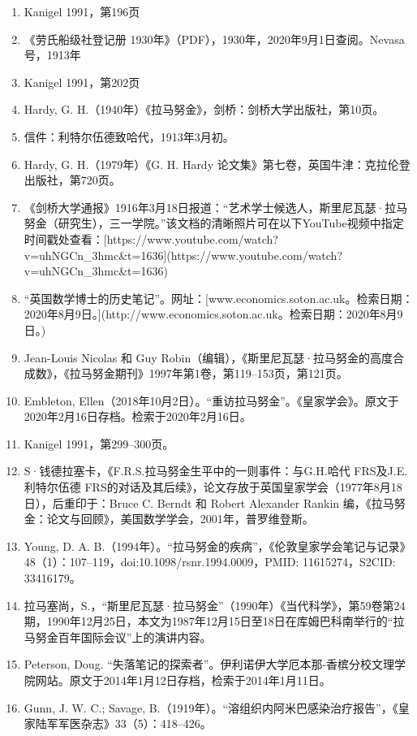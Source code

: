 \begin{enumerate}
\item Kanigel 1991，第196页
\item 《劳氏船级社登记册 1930年》（PDF），1930年，2020年9月1日查阅。Nevasa号，1913年
\item Kanigel 1991，第202页
\item Hardy, G. H.（1940年）《拉马努金》，剑桥：剑桥大学出版社，第10页。
\item 信件：利特尔伍德致哈代，1913年3月初。
\item Hardy, G. H.（1979年）《G. H. Hardy 论文集》第七卷，英国牛津：克拉伦登出版社，第720页。
\item 《剑桥大学通报》1916年3月18日报道：“艺术学士候选人，斯里尼瓦瑟·拉马努金（研究生），三一学院。”该文档的清晰照片可在以下YouTube视频中指定时间戳处查看：[https://www.youtube.com/watch?v=uhNGCn\_3hmc\&t=1636](https://www.youtube.com/watch?v=uhNGCn_3hmc&t=1636)
\item “英国数学博士的历史笔记”。网址：[www.economics.soton.ac.uk。检索日期：2020年8月9日。](http://www.economics.soton.ac.uk。检索日期：2020年8月9日。)
\item Jean-Louis Nicolas 和 Guy Robin（编辑），《斯里尼瓦瑟·拉马努金的高度合成数》，《拉马努金期刊》1997年第1卷，第119–153页，第121页。
\item Embleton, Ellen（2018年10月2日）。“重访拉马努金”。《皇家学会》。原文于2020年2月16日存档。检索于2020年2月16日。
\item Kanigel 1991，第299–300页。
\item S·钱德拉塞卡，《F.R.S.拉马努金生平中的一则事件：与G.H.哈代 FRS及J.E.利特尔伍德 FRS的对话及其后续》，论文存放于英国皇家学会（1977年8月18日），后重印于：Bruce C. Berndt 和 Robert Alexander Rankin 编，《拉马努金：论文与回顾》，美国数学学会，2001年，普罗维登斯。
\item Young, D. A. B.（1994年）。“拉马努金的疾病”，《伦敦皇家学会笔记与记录》48（1）：107–119，doi:10.1098/rsnr.1994.0009，PMID: 11615274，S2CID: 33416179。
\item 拉马塞尚，S.，“斯里尼瓦瑟·拉马努金”（1990年）《当代科学》，第59卷第24期，1990年12月25日，本文为1987年12月15日至18日在库姆巴科南举行的“拉马努金百年国际会议”上的演讲内容。
\item Peterson, Doug. “失落笔记的探索者”。伊利诺伊大学厄本那-香槟分校文理学院网站。原文于2014年1月12日存档，检索于2014年1月11日。
\item Gunn, J. W. C.; Savage, B.（1919年）。“溶组织内阿米巴感染治疗报告”，《皇家陆军军医杂志》33（5）：418–426。



\end{enumerate}
